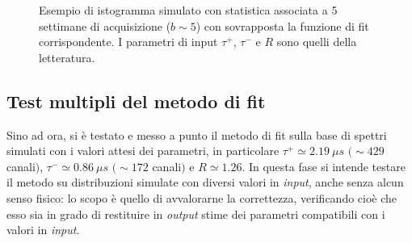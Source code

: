 \documentclass[10pt, oneside, a4paper]{article}   	%
\begin{document}
\begin{figure}[h]
 \centerline{}
 \caption{Esempio di istogramma simulato con statistica associata a 5 settimane di acquisizione ($b\sim5$) con sovrapposta la funzione di fit corrispondente. I parametri di input $\tau^+$, $\tau^-$ e $R$ sono quelli della letteratura.}
 \label{fig::esempio_spettro_simulato}
\end{figure}
%
\subsection{Test multipli del metodo di fit}
Sino ad ora, si è testato e messo a punto il metodo di fit sulla base di spettri simulati con i valori attesi dei parametri, in particolare $\tau^+  \simeq 2.19  \ \mu s$ $(\sim 429$ canali$)$, $\tau^- \simeq 0.86 \  \mu s$ $(\sim 172$ canali$)$ e $R\simeq1.26$. 
In questa fase si intende testare il metodo su distribuzioni simulate con diversi valori in \textit{input}, anche senza alcun senso fisico: lo scopo è quello di avvalorarne la correttezza, verificando cioè che esso sia in grado di restituire in \textit{output} stime dei parametri compatibili con i valori in \textit{input}.
\end{document}
